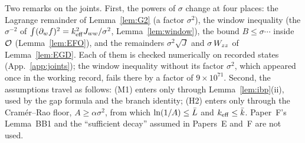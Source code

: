 Two remarks on the joints.
First, the powers of $\sigma$ change at four places: the Lagrange remainder of Lemma~\ref{lem:G2} (a factor $\sigma^2$), the window inequality (the $\sigma^{-2}$ of $\int(\partial_wf)^2=k_{\mathrm{eff}}^2J_{ww}/\sigma^2$, Lemma~\ref{lem:window}), the bound $B\le\sigma\cdots$ inside $\mathcal O$ (Lemma~\ref{lem:EFO}), and the remainders $\sigma^2\sqrt J$ and $\sigma\,W_{zz}$ of Lemma~\ref{lem:EGD}.
Each of them is checked numerically on recorded states (App.~\ref{app:joints}); the window inequality without its factor $\sigma^2$, which appeared once in the working record, fails there by a factor of $9\times10^{71}$.
Second, the assumptions travel as follows: (M1) enters only through Lemma~\ref{lem:ibp}(ii), used by the gap formula and the branch identity; (H2) enters only through the Cram\'er--Rao floor, $A\ge\alpha\sigma^2$, from which $\ln(1/A)\le\bar L$ and $k_{\mathrm{eff}}\le\bar k$.
Paper~F's Lemma~BB1 and the ``sufficient decay'' assumed in Papers~E and~F are not used.
